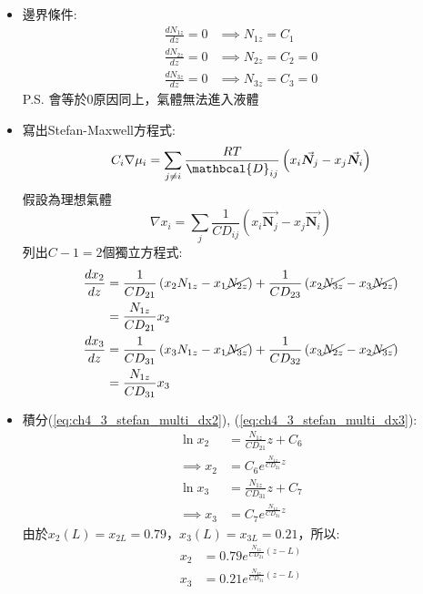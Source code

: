 \documentclass[../main.tex]{subfiles}
\begin{document}
\begin{itemize}
  \item 邊界條件:
  \begin{align}
    \frac{dN_{1z}}{dz} = 0 & \implies N_{1z} = C_1 \\
    \frac{dN_{2z}}{dz} = 0 & \implies N_{2z} = C_2 = 0 \\
    \frac{dN_{3z}}{dz} = 0 & \implies N_{3z} = C_3 = 0
  \end{align}
  P.S. 會等於0原因同上，氣體無法進入液體
  \item 寫出Stefan-Maxwell方程式:
  \begin{equation}
    C_i\nabla \mu_i = \sum_{j\neq i} \frac{RT}{\mathbcal{D}_{ij}} \left(
      x_i \vec{\bm N_j} - x_j \vec{\bm N_i}
    \right)
  \end{equation}
  假設為理想氣體
  \begin{equation}
    \nabla x_i = \sum_j \frac{1}{C D_{ij}} \left(
      x_i \vec{\bm N_j} - x_j \vec{\bm N_i}
    \right)
  \end{equation}
  列出$C-1=2$個獨立方程式:
  \begin{align}
    \frac{dx_2}{dz} &= \frac{1}{C D_{21}}\left(
      x_2 N_{1z} - x_1 \cancel{N_{2z}}
    \right)+ \frac{1}{C D_{23}}\left(
      x_2 \cancel{N_{3z}} - x_3 \cancel{N_{2z}}
    \right) \nonumber\\
    &= \frac{N_{1z}}{C D_{21}} x_2 \label{eq:ch4_3_stefan_multi_dx2}\\
    \frac{dx_3}{dz} &= \frac{1}{C D_{31}}\left(
      x_3 N_{1z} - x_1 \cancel{N_{3z}}
    \right)+ \frac{1}{C D_{32}}\left(
      x_3 \cancel{N_{2z}} - x_2 \cancel{N_{3z}}
    \right) \nonumber\\
    &= \frac{N_{1z}}{C D_{31}} x_3 \label{eq:ch4_3_stefan_multi_dx3}
  \end{align}
  \item 積分(\ref{eq:ch4_3_stefan_multi_dx2}), (\ref{eq:ch4_3_stefan_multi_dx3}):
  \begin{align}
    \ln x_2 &= \frac{N_{1z}}{C D_{21}} z + C_6 \nonumber\\
    \implies x_2 &= C_6e^{\frac{N_{1z}}{C D_{21}} z} \\
    \ln x_3 &= \frac{N_{1z}}{C D_{31}} z + C_7 \nonumber\\
    \implies x_3 &= C_7 e^{\frac{N_{1z}}{C D_{31}} z }
  \end{align}
  由於$x_2(L) = x_{2L}=0.79$，$x_3(L) = x_{3L}=0.21$，所以:
  \begin{align}
    x_2 &= 0.79 e^{\frac{N_{1z}}{C D_{21}} (z - L)} \\
    x_3 &= 0.21 e^{\frac{N_{1z}}{C D_{31}} (z - L)}

\end{align}
\end{itemize}
\end{document}
